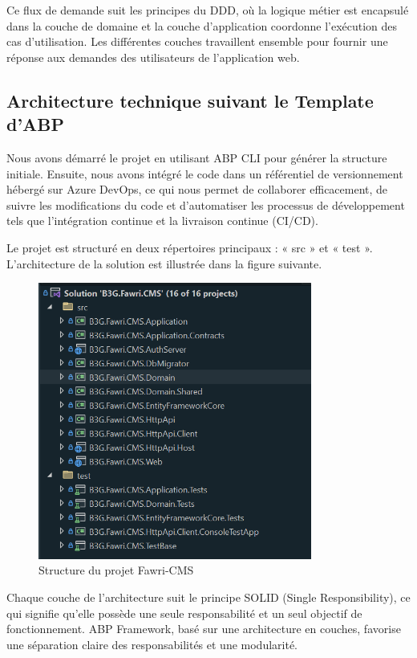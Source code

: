 Ce flux de demande suit les principes du DDD, où la logique métier est encapsulé dans la couche de domaine et la couche d'application coordonne l'exécution des cas d'utilisation. Les différentes couches travaillent ensemble pour fournir une réponse aux demandes des utilisateurs de l'application web.

\subsection{Architecture technique suivant le Template d’ABP}

\hspace{\parindent}Nous avons démarré le projet en utilisant ABP CLI pour générer la structure initiale. Ensuite, nous avons intégré le code dans un référentiel de versionnement hébergé sur Azure DevOps, ce qui nous permet de collaborer efficacement, de suivre les modifications du code et d'automatiser les processus de développement tels que l'intégration continue et la livraison continue (CI/CD).


Le projet est structuré en deux répertoires principaux : « src » et « test ». L'architecture de la solution est illustrée dans la figure suivante.



\begin{figure}[H]
    \centering
    \includegraphics[width=9cm]{Figures/src test.PNG}
    \caption{Structure du projet Fawri-CMS}
\end{figure}


Chaque couche de l'architecture suit le principe SOLID (Single Responsibility), ce qui signifie qu'elle possède une seule responsabilité et un seul objectif de fonctionnement. ABP Framework, basé sur une architecture en couches, favorise une séparation claire des responsabilités et une modularité.

